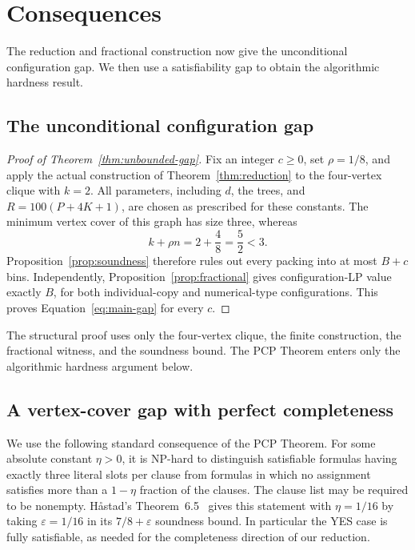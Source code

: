 \section{Consequences}\label{sec:consequences}

The reduction and fractional construction now give the unconditional
configuration gap. We then use a satisfiability gap to obtain the
algorithmic hardness result.

\subsection{The unconditional configuration gap}

\begin{proof}[Proof of Theorem~\ref{thm:unbounded-gap}]
Fix an integer $c\ge0$, set $\rho=1/8$, and apply the actual construction
of Theorem~\ref{thm:reduction} to the four-vertex clique with $k=2$.
All parameters, including $d$, the trees, and
$R=100(P+4K+1)$, are chosen as prescribed for these constants.
The minimum vertex cover of this graph has size three, whereas
\begin{equation}\label{eq:clique-cover-contradiction}
  k+\rho n=2+\frac48=\frac52<3.
\end{equation}
Proposition~\ref{prop:soundness} therefore rules out every packing into
at most $B+c$ bins.  Independently,
Proposition~\ref{prop:fractional} gives configuration-LP value exactly
$B$, for both individual-copy and numerical-type configurations.
This proves Equation~\eqref{eq:main-gap} for every $c$.
\end{proof}

The structural proof uses only the four-vertex clique, the finite
construction, the fractional witness, and the soundness bound. The PCP
Theorem enters only the algorithmic hardness argument below.

\subsection{A vertex-cover gap with perfect completeness}

We use the following standard consequence of the PCP Theorem.
For some absolute constant $\eta>0$, it is NP-hard to distinguish
satisfiable formulas having exactly three literal slots per clause from
formulas in which no assignment satisfies more than a $1-\eta$ fraction
of the clauses.  The clause list may be required to be nonempty.
H\aa stad's Theorem~6.5~\cite{Hastad2001} gives this statement with
$\eta=1/16$ by taking $\varepsilon=1/16$ in its
$7/8+\varepsilon$ soundness bound.  In particular the YES case is fully
satisfiable, as needed for the completeness direction of our reduction.

